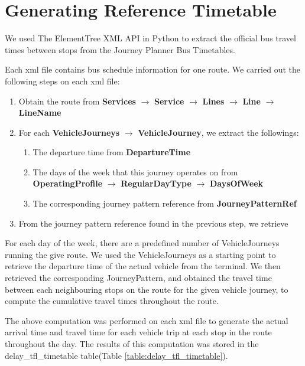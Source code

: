 \section{Generating Reference Timetable}
\label{sec: official_tfl_timetable}
\par We used The ElementTree XML API in Python \cite{elementtree} to extract the official bus travel times between stops from the Journey Planner Bus Timetables\cite{open_data_feeds_description}.

\par Each \acrshort{xml} file contains bus schedule information for one route. We carried out the following steps on each \acrshort{xml} file:

\begin{enumerate}
  \item Obtain the route from \textbf{Services} $\rightarrow$ \textbf{Service} $\rightarrow$ \textbf{Lines} $\rightarrow$ \textbf{Line} $\rightarrow$ \textbf{LineName}
  \item For each \textbf{VehicleJourneys} $\rightarrow$ \textbf{VehicleJourney}, we extract the followings:
  \begin{enumerate}
    \item The departure time from \textbf{DepartureTime}
    \item The days of the week that this journey operates on from \textbf{OperatingProfile} $\rightarrow$ \textbf{RegularDayType} $\rightarrow$ \textbf{DaysOfWeek}
    \item The corresponding journey pattern reference from \textbf{JourneyPatternRef}
  \end{enumerate}
  \item From the journey pattern reference found in the previous step, we retrieve

\end{enumerate}



For each day of the week, there are a predefined number of VehicleJourneys running the give route. We used the VehicleJourneys as a starting point to retrieve the departure time of the actual vehicle from the terminal. We then retrieved the corresponding JourneyPattern, and obtained the travel time between each neighbouring stops on the route for the given vehicle journey, to compute the cumulative travel times throughout the route.

The above computation was performed on each xml file to generate the actual arrival time and travel time for each vehicle trip at each stop in the route throughout the day. The results of this computation was stored in the delay\_tfl\_timetable table(Table \ref{table:delay_tfl_timetable}).
